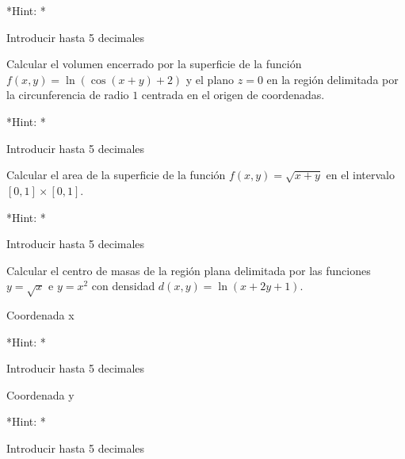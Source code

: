 \documentclass[
  a4paper,
]{scrreport}
\theoremstyle{definition}
\theoremstyle{remark}
\begin{document}
\vspace{18pt}*Hint: *

Introducir hasta 5 decimales

\leavevmode{}%
Calcular el volumen encerrado por la superficie de la función
\(f(x,y)=\ln(\cos(x+y)+2)\) y el plano \(z=0\) en la región delimitada
por la circunferencia de radio \(1\) centrada en el origen de
coordenadas.

\vspace{18pt}*Hint: *

Introducir hasta 5 decimales

\leavevmode{}%
Calcular el area de la superficie de la función \(f(x,y)=\sqrt{x+y}\) en
el intervalo \([0,1]\times[0,1]\).

\vspace{18pt}*Hint: *

Introducir hasta 5 decimales

\leavevmode{}%
Calcular el centro de masas de la región plana delimitada por las
funciones \(y=\sqrt{x}\) e \(y=x^2\) con densidad
\(d(x,y)= \ln(x+2y+1)\).

Coordenada x

\vspace{18pt}*Hint: *

Introducir hasta 5 decimales

Coordenada y

\vspace{18pt}*Hint: *

Introducir hasta 5 decimales
\end{document}
